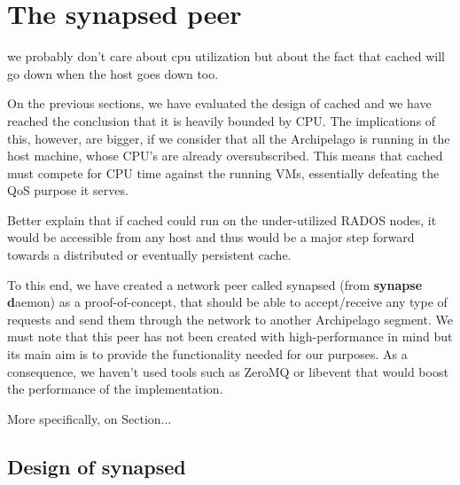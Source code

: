 \chapter{The synapsed peer}

\fixme we probably don't care about cpu utilization but about the fact that 
cached will go down when the host goes down too.

On the previous sections, we have evaluated the design of cached and we have 
reached the conclusion that it is heavily bounded by CPU. The implications of 
this, however, are bigger, if we consider that all the Archipelago is running 
in the host machine, whose CPU's are already oversubscribed. This means that 
cached must compete for CPU time against the running VMs, essentially defeating 
the QoS purpose it serves.

\todo Better explain that if cached could run on the under-utilized RADOS 
nodes, it would be accessible from any host and thus would be a major step 
forward towards a distributed or eventually persistent cache.

\begin{comment}
On the other hand, on the RADOS nodes, the CPUs and RAM are not used to their 
full potential. Also, since these nodes are accessible from any host, it would 
be a step forward in making cached distributed if cached could run there.

Thus, it would be interesting to check how well cached (and Archipelago in 
general) would behave, if the VM's data where sent initially over network and 
then handled by the vlmcd. So what we mean is to turn the current situation 
from how it is in Figure \ref{fig:new_sxima.pdf} to the following:

\fixme add figure for network
\end{comment}

To this end, we have created a network peer called synapsed (from 
\textbf{synapse d}aemon) as a proof-of-concept, that should be able to 
accept/receive any type of requests and send them through the network to 
another Archipelago segment. We must note that this peer has not been created 
with high-performance in mind but its main aim is to provide the functionality 
needed for our purposes.  As a consequence, we haven't used tools such as 
ZeroMQ or libevent that would boost the performance of the implementation.

More specifically, on Section...

\section{Design of synapsed}

